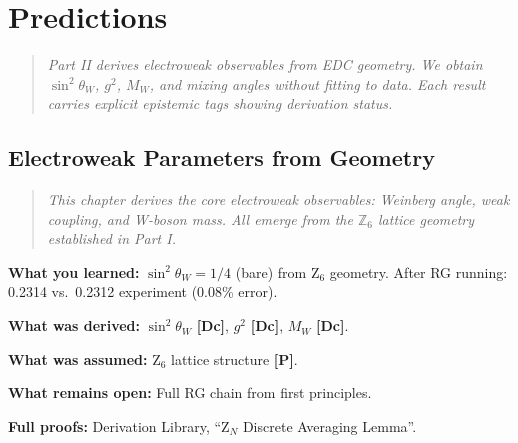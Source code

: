 \documentclass[11pt,a4paper]{book}
\theoremstyle{definition}
\theoremstyle{remark}
\newcommand{\tagDc}{\textcolor{calibratedColor}{\textbf{[Dc]}}}
\newcommand{\tagP}{\textcolor{postulatedColor}{\textbf{[P]}}}
\begin{document}

\part{Predictions}
\label{part:predictions}

\begin{quote}
\textit{Part II derives electroweak observables from EDC geometry. We obtain
$\sin^2\theta_W$, $g^2$, $M_W$, and mixing angles without fitting to data.
Each result carries explicit epistemic tags showing derivation status.}
\end{quote}

\chapter{Electroweak Parameters from Geometry}
\label{ch:electroweak}
\label{ch:z6_program}%

\begin{quote}
\textit{This chapter derives the core electroweak observables: Weinberg angle,
weak coupling, and W-boson mass. All emerge from the $\mathbb{Z}_6$ lattice
geometry established in Part I.}
\end{quote}



\begin{chapterRecap}
\textbf{What you learned:} $\sin^2\theta_W = 1/4$ (bare) from Z$_6$ geometry.
After RG running: 0.2314 vs.\ 0.2312 experiment (0.08\% error).

\textbf{What was derived:} $\sin^2\theta_W$ \tagDc{}, $g^2$ \tagDc{}, $M_W$ \tagDc{}.

\textbf{What was assumed:} Z$_6$ lattice structure \tagP{}.

\textbf{What remains open:} Full RG chain from first principles.

\textbf{Full proofs:} Derivation Library, ``Z$_N$ Discrete Averaging Lemma''.
\end{chapterRecap}

\end{document}
